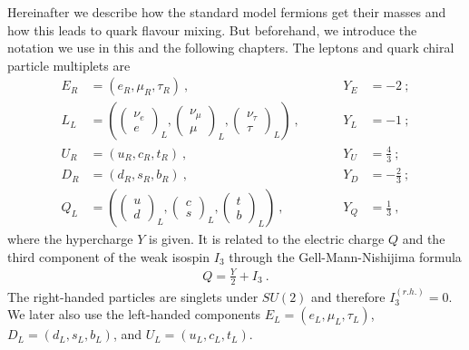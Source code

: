 Hereinafter we describe how the standard model fermions get their masses and how this leads to quark flavour mixing. But beforehand, we introduce the notation we use in this and the following chapters. The leptons and quark chiral particle multiplets are
\begin{align}
	E_R &= (e_R,\mu_R,\tau_R) \ , &&\quad &Y_E &= -2 \ ; \\
	L_L &= \left(\begin{pmatrix} \nu_e \\ e \end{pmatrix}_L,
	\begin{pmatrix} \nu_\mu \\ \mu \end{pmatrix}_L,
	\begin{pmatrix} \nu_\tau \\ \tau \end{pmatrix}_L\right) \ , &&\quad &Y_L &= -1 \ ; \\
	U_R &= (u_R,c_R,t_R) \ , &&\quad &Y_U &= \frac{4}{3} \ ; \\
	D_R &= (d_R,s_R,b_R) \ , &&\quad &Y_D &= -\frac{2}{3} \ ; \\
	Q_L &= \left(\begin{pmatrix} u \\ d \end{pmatrix}_L,
	\begin{pmatrix} c \\ s \end{pmatrix}_L,
	\begin{pmatrix} t \\ b \end{pmatrix}_L\right) \ , &&\quad &Y_Q &= \frac{1}{3} \ ,
\end{align}
where the hypercharge $Y$ is given. It is related to the electric charge $Q$ and the third component of the weak isospin $I_3$ through the Gell-Mann-Nishijima formula \cite[Chapter 10.7]{Griffiths}
\begin{align}\label{eq:GellMann}
	Q = \frac{Y}{2} + I_3 \ .
\end{align}
The right-handed particles are singlets under $SU(2)$ and therefore $I^{(r.h.)}_3=0$. We later also use the left-handed components $E_L = (e_L,\mu_L,\tau_L)$, $D_L = (d_L,s_L,b_L)$, and $U_L = (u_L,c_L,t_L)$.


